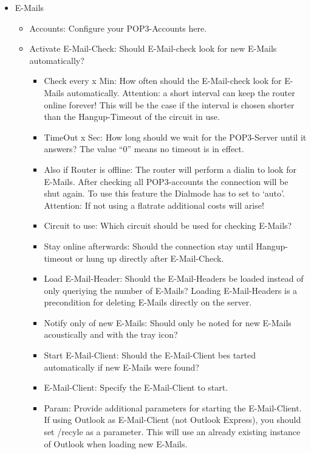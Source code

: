 \begin{itemize}
  \item \mbox{E-Mails}
    \begin{itemize}
      \item Accounts: Configure your POP3-Accounts here.
      \item Activate \mbox{E-Mail}-Check: Should \mbox{E-Mail}-check look for new
        \mbox{E-Mails} automatically?
        \begin{itemize}
          \item Check every x Min: How often should the \mbox{E-Mail}-check look for \mbox{E-Mails}
	    automatically. Attention: a short interval can keep the router online forever!
	    This will be the case if the interval is chosen shorter than the Hangup-Timeout
	    of the circuit in use.
          \item TimeOut x Sec: How long should we wait for the POP3-Server until it answers?
            The value ``0'' means no timeout is in effect.
          \item Also if Router is offline: The router will perform a dialin to look for
            \mbox{E-Mails}. After checking all POP3-accounts the connection will be shut again.
            To use this feature the Dialmode has to set to `auto'. Attention: If not using a
            flatrate additional costs will arise!
          \item Circuit to use: Which circuit should be used for checking \mbox{E-Mails}?
          \item Stay online afterwards: Should the connection stay until Hangup-timeout or hung up
	    directly after \mbox{E-Mail}-Check.
          \item Load \mbox{E-Mail}-Header: Should the \mbox{E-Mail}-Headers be loaded instead of
            only queriying the number of \mbox{E-Mails}? Loading \mbox{E-Mail}-Headers is a
            precondition for deleting \mbox{E-Mails} directly on the server.
         \item Notify only of new \mbox{E-Mails}: Should only be noted for new \mbox{E-Mails}
	   acoustically and with the tray icon?
         \item Start \mbox{E-Mail}-Client: Should the \mbox{E-Mail}-Client bes tarted
           automatically if new \mbox{E-Mails} were found?
         \item \mbox{E-Mail}-Client: Specify the \mbox{E-Mail}-Client to start.
         \item Param: Provide additional parameters for starting the \mbox{E-Mail}-Client.
	    If using Outlook as \mbox{E-Mail}-Client (not Outlook Express), you should
	    set /recyle as a parameter. This will use an already existing instance of Outlook
	    when loading new \mbox{E-Mails}.
      \end{itemize}
    \end{itemize}


\end{itemize}
